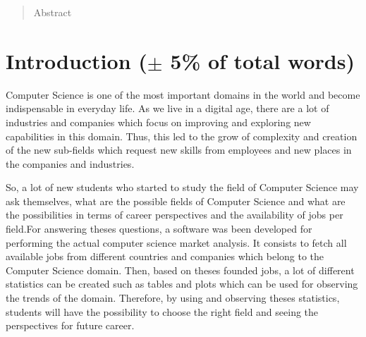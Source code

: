 \documentclass[conference,compsoc]{IEEEtran}
\begin{document}




\maketitle

\begin{abstract}
Abstract
\end{abstract}


%
\IEEEpeerreviewmaketitle

\section{Introduction ($\pm$ 5\% of total words)}
Computer Science is one of the most important domains in the world and become indispensable in everyday life. As we live in a digital age, there are a lot of industries and companies which focus on improving and exploring new capabilities in this domain. Thus, this led to the grow of complexity and creation of the new sub-fields which request new skills from employees and new places in the companies and industries. 

So, a lot of new students who started to study the field of Computer Science may ask themselves, what are the possible fields of Computer Science and what are the possibilities in terms of career perspectives and the availability of jobs per field.For answering theses questions, a software was been developed for performing the actual computer science market analysis. It consists to fetch all available jobs from different countries and companies which belong to the Computer Science domain. Then, based on theses founded jobs, a lot of different statistics can be created such as tables and plots which can be used for observing the trends of the domain. Therefore, by using and observing theses statistics, students will have the possibility to choose the right field and seeing the perspectives for future career.       
                                                            
\end{document}
